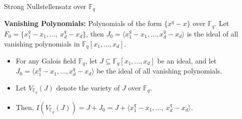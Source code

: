 \documentclass[xcolor=dvipsnames]{beamer}
\newcommand{\Fq}{{\mathbb{F}}_{q}}
\begin{document}
\begin{frame}{\large {Strong Nullstellensatz over $\Fq$} }
\begin{Definition}
{\bf Vanishing Polynomials:}
Polynomials of the form $\{x^q - x\}$ over $\Fq$. Let $F_0 = \{x_1^q - x_1,
\dots, ~x_d^q - x_d\}$, then $J_0 = \langle x_1^q - x_1, \dots, x_d^q
- x_d\rangle$ is the ideal of all vanishing polynomials in
$\mathbb{F}_q[x_1,\dots,   x_d]$.
\end{Definition}
\begin{itemize}
\item For any Galois field $\Fq$, let $J \subseteq \Fq[x_1,\dots,x_d]$ be an ideal, and let 
$J_0 = \langle x_1^q - x_1, \dots, x_d^q - x_d\rangle$ be
the ideal of all vanishing polynomials.
\item Let $V_{\Fq}(J)$ denote the
variety of $J$ over $\Fq$.
\item Then, $I(V_{\Fq}(J)) = J + J_0 = J +
\langle  x_1^q - x_1, \dots, ~x_d^q - x_d\rangle$.
\end{itemize}
\end{frame}
\end{document}
